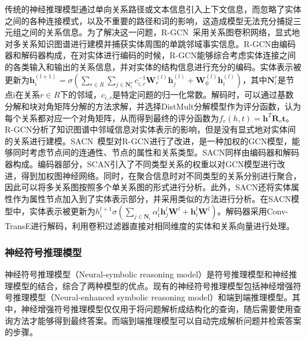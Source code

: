 \documentclass[algorithmlist, AutoFakeBold, AutoFakeSlant, figurelist, tablelist, nomlist, engineering]{seuthesix}
\begin{document}
传统的神经推理模型通过单向关系路径或文本信息引入上下文信息，而忽略了实体之间的各种连接模式，以及不重要的路径和词的影响，这造成模型无法充分捕捉三元组之间的关系信息。为了解决这一问题，R-GCN~\cite{schlichtkrull2018modeling}采用关系图卷积网络，显式地对多关系知识图谱进行建模并捕获实体周围的单跳邻域事实信息。R-GCN由编码器和解码器构成，在对实体进行编码的时候，R-GCN能够综合考虑实体连接之间的各类输入和输出的关系信息，并对实体的结构信息进行充分的编码。实体表示被更新为$\bm{h}_i^{(l+1)}=\sigma\left(\sum_{r \in R} \sum_{j \in \mathbf{N}_i^r} c_{i, r}^{-1} \mathbf{W}_r^{(l)} \bm{h}_j^{(l)}+\mathbf{W}_0^{(l)} \bm{h}_i^{(l)}\right)$，其中$\mathbf{N}_i^r$是节点i在关系$r \in R$下的邻域，$c_{i,r}$是特定问题的归一化常数。解码时，可以通过基数分解和块对角矩阵分解的方法求解，并选择DistMult分解模型作为评分函数，认为每个关系都对应一个对角矩阵，从而得到最终的评分函数为$f_r(h, t)=\bm{h}^T \mathbf{R}_r \bm{t}$。R-GCN分析了知识图谱中邻域信息对实体表示的影响，但是没有显式地对实体间的关系进行建模。SACN~\cite{shang2019end}模型对R-GCN进行了改进，是一种加权的GCN模型，能够同时考虑节点间的连通性、节点的属性和关系类型。SACN同样由编码器和解码器构成。编码器部分，SCAN引入了不同类型关系的权重以对GCN模型进行改进，得到加权图神经网络。同时，在聚合信息时对不同类型的关系分别进行聚合，因此可以将多关系图按照多个单关系图的形式进行分析。此外，SACN还将实体属性作为属性节点加入到了实体表示部分，并采用类似的方法进行分析。在SACN模型中，实体表示被更新为$h_i^{l+1}\sigma\left(\sum_{j \in \mathbf{N}_i} \alpha_t^l \bm{h}_j^l \mathbf{W}^l+\bm{h}_i^l \mathbf{W}^l\right)$。解码器采用Conv-TransE进行解码，利用卷积过滤器直接对相同维度的实体和关系向量进行处理。

\subsubsection{神经符号推理模型}
神经符号推理模型（Neural-symbolic reasoning model）是符号推理模型和神经推理模型的结合，综合了两种模型的优点。现有的神经符号推理模型包括神经增强符号推理模型（Neural-enhanced symbolic reasoning model）和端到端推理模型。其中，神经增强符号推理模型仅仅用于将问题解析成结构化的查询，随后需要使用查询方法才能够得到最终答案。而端到端推理模型可以自动完成解析问题并检索答案的步骤。
\end{document}
